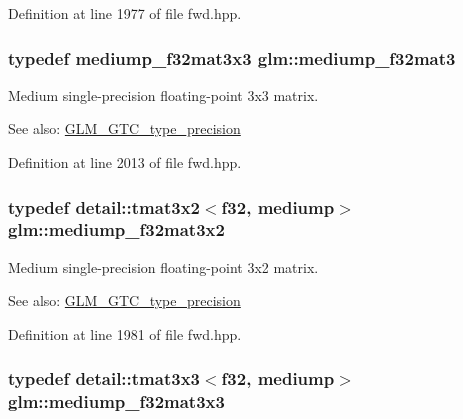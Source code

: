 Definition at line 1977 of file fwd.hpp.\hypertarget{group__gtc__type__precision_ge263a08ef179894fdd36f9a51698c4ab}{
\subsubsection[mediump\_\-f32mat3]{\setlength{\rightskip}{0pt plus 5cm}typedef mediump\_\-f32mat3x3 {\bf glm::mediump\_\-f32mat3}}}
\label{group__gtc__type__precision_ge263a08ef179894fdd36f9a51698c4ab}


Medium single-precision floating-point 3x3 matrix. \begin{Desc}
\item[See also:]\hyperlink{group__gtc__type__precision}{GLM\_\-GTC\_\-type\_\-precision} \end{Desc}


Definition at line 2013 of file fwd.hpp.\hypertarget{group__gtc__type__precision_g9762d48bb9b41e3cf40f6e616cf61b6b}{
\subsubsection[mediump\_\-f32mat3x2]{\setlength{\rightskip}{0pt plus 5cm}typedef detail::tmat3x2$<$f32, mediump$>$ {\bf glm::mediump\_\-f32mat3x2}}}
\label{group__gtc__type__precision_g9762d48bb9b41e3cf40f6e616cf61b6b}


Medium single-precision floating-point 3x2 matrix. \begin{Desc}
\item[See also:]\hyperlink{group__gtc__type__precision}{GLM\_\-GTC\_\-type\_\-precision} \end{Desc}


Definition at line 1981 of file fwd.hpp.\hypertarget{group__gtc__type__precision_gd4d01189a1462366b143c5cbc3de0ea9}{
\subsubsection[mediump\_\-f32mat3x3]{\setlength{\rightskip}{0pt plus 5cm}typedef detail::tmat3x3$<$f32, mediump$>$ {\bf glm::mediump\_\-f32mat3x3}}}
\label{group__gtc__type__precision_gd4d01189a1462366b143c5cbc3de0ea9}


